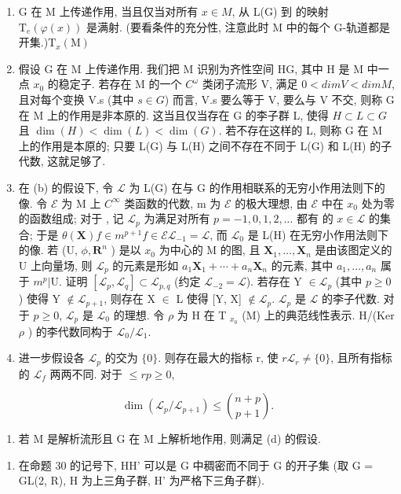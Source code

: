 \begin{enumerate}
\def\labelenumi{(\alph{enumi})}
\item
  G 在 M 上传递作用, 当且仅当对所有 \(x \in M\), 从 L(G) 到  的映射 \(\mathrm{T}_{e}(\varphi(x))\) 是满射. (要看条件的充分性, 注意此时 M 中的每个 G-轨道都是开集.)\(\mathrm{T}_{x}(\mathrm{M})\)
\item
  假设 G 在 M 上传递作用. 我们把 M 识别为齐性空间 H\textbar G, 其中 H 是 M 中一点 \(x_{0}\) 的稳定子. 若存在 M 的一个 \(C^{\omega}\) 类闭子流形 V, 满足 \(0 < dim V < dim M\), 且对每个变换 V.s (其中 \(s \in G\)) 而言, V.s 要么等于 V, 要么与 V 不交, 则称 G 在 M 上的作用是非本原的. 这当且仅当存在 G 的李子群 L, 使得 \(H \subset L \subset G\) 且 \(\dim(H) < \dim(L) < \dim(G)\). 若不存在这样的 L, 则称 G 在 M 上的作用是本原的; 只要 L(G) 与 L(H) 之间不存在不同于 L(G) 和 L(H) 的子代数, 这就足够了.
\item
  在 (b) 的假设下, 令 \(\mathcal{L}\) 为 L(G) 在与 G 的作用相联系的无穷小作用法则下的像. 令 \(\mathcal{E}\) 为 M 上 \(C^\infty\) 类函数的代数, m 为 \(\mathcal{E}\) 的极大理想, 由 \(\mathcal{E}\) 中在 \(x_0\) 处为零的函数组成; 对于 , 记 \(\mathcal{L}_p\) 为满足对所有 \(p = -1, 0, 1, 2, \ldots\) 都有  的 \(x \in \mathcal{L}\) 的集合; 于是 \(\theta(\mathbf{X}) f \in m^{p+1}\)\(f \in \mathcal{E}\)\(\mathcal{L}_{-1} = \mathcal{L}\), 而 \(\mathcal{L}_0\) 是 L(H) 在无穷小作用法则下的像. 若 (U, \(\phi, \mathbf{R}^n\) ) 是以 \(x_0\) 为中心的 M 的图, 且 \(\mathbf{X}_1, \ldots, \mathbf{X}_n\) 是由该图定义的 U 上向量场, 则 \(\mathcal{L}_p\) 的元素是形如 \(a_1\mathbf{X}_1 + \cdots + a_n\mathbf{X}_n\) 的元素, 其中 \(a_1, \ldots, a_n\) 属于 \(m^p|\text{U}\). 证明 \([\mathcal{L}_p, \mathcal{L}_q] \subset \mathcal{L}_{p,q}\) (约定 \(\mathcal{L}_{-2} = \mathcal{L}\)). 若存在 Y \(\in \mathcal{L}_p\) (其中 \(p \geqslant 0\)) 使得 Y \(\notin \mathcal{L}_{p+1}\), 则存在 X \(\in\) L 使得 {[}Y, X{]} \(\notin \mathcal{L}_p\). \(\mathcal{L}_p\) 是 \(\mathcal{L}\) 的李子代数. 对于 \(p \geqslant 0\), \(\mathcal{L}_p\) 是 \(\mathcal{L}_0\) 的理想. 令 \(\rho\) 为 H 在 T \(_{x_0}\) (M) 上的典范线性表示. H/(Ker \(\rho\) ) 的李代数同构于 \(\mathcal{L}_0/\mathcal{L}_1\).
\item
  进一步假设各 \(\mathcal{L}_p\) 的交为 \(\{0\}\). 则存在最大的指标 r, 使 \(r\)\(\mathcal{L}_r \neq \{0\}\), 且所有指标  的 \(\mathcal{L}_f\) 两两不同. 对于 \(\leqslant r\)\(p \geqslant 0\),
\end{enumerate}

\[
\dim (\mathcal {L} _ {p} / \mathcal {L} _ {p + 1}) \leqslant \binom {n + p} {p + 1}.
\]

\begin{enumerate}
\def\labelenumi{(\alph{enumi})}
\setcounter{enumi}{4}
\tightlist
\item
  若 M 是解析流形且 G 在 M 上解析地作用, 则满足 (d) 的假设.
\end{enumerate}

\begin{enumerate}
\def\labelenumi{\arabic{enumi}.}
\setcounter{enumi}{8}
\tightlist
\item
  在命题 30 的记号下, HH' 可以是 G 中稠密而不同于 G 的开子集 (取 G = GL(2, R), H 为上三角子群, H' 为严格下三角子群).
\end{enumerate}


